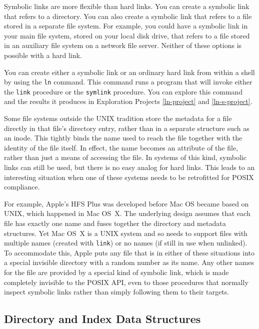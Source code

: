 Symbolic links are more flexible than hard links.  You can create a symbolic link that refers to a directory.  You can also create a symbolic link that refers to a file stored in a separate file system.  For example, you could have a symbolic link in your main file system, stored on your local disk drive, that refers to a file stored in an auxiliary file system on a network file server.  Neither of these options is possible with a hard link.

You can create either a symbolic link or an ordinary hard link from
within a shell by using the \verb|ln| command.  This command runs a
program that will invoke either the \verb|link| procedure or the
\verb|symlink| procedure.  You can explore this command and the
results it produces in Exploration Projects \ref{ln-project} and
\ref{ln-s-project}.

Some file systems outside the UNIX tradition store the metadata for a
file directly in that file's directory entry, rather than in a
separate structure such as an inode.  This tightly binds the name used
to reach the file together with the identity of the file itself.  In
effect, the name becomes an attribute of the file, rather than just a
means of accessing the file.  In
systems of this kind, symbolic links can still be used, but there is
no easy analog for hard links.  This leads to an interesting situation
when one of these systems needs to be retrofitted for POSIX
compliance.

For example, Apple's HFS Plus was developed before Mac OS became
based on UNIX, which happened in Mac OS~X.  The underlying design assumes that each
file has exactly one name and fuses together the directory and
metadata structures.  Yet Mac OS~X is a UNIX system
and so needs to support files with multiple names (created with
\verb|link|) or no names (if still in use when unlinked).  To
accommodate this, Apple puts any file that is in either of these
situations into a special invisible directory with a random number as
its name.  Any other names for the file are provided by a special kind
of symbolic link, which is made completely invisible to the POSIX API,
even to those procedures that normally inspect symbolic links
rather than simply following them to their targets.

\subsection{Directory and Index Data Structures}\label{directory-index-structures-section}

